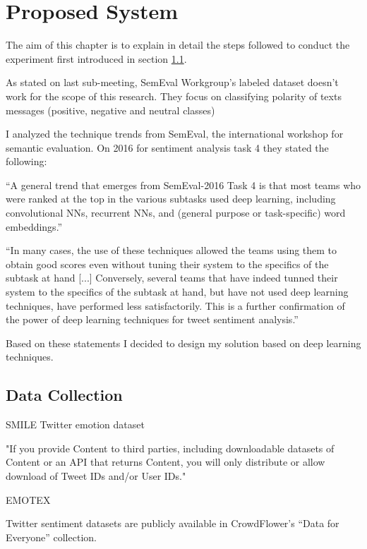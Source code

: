 \chapter{Proposed System}

The aim of this chapter is to explain in detail the steps followed to conduct the experiment first introduced in section \ref{}.

\cite{roberts2012empatweet}

As stated on last sub-meeting, SemEval Workgroup's\cite{SemEvalPortal} labeled dataset doesn't work for the scope of this research. They focus on classifying polarity of texts messages (positive, negative and neutral classes)

I analyzed the technique trends from SemEval, the international workshop for semantic evaluation. On 2016 for sentiment analysis task 4 they stated the following: 

“A general trend that emerges from SemEval-2016 Task 4 is that most teams who were ranked at the top in the various subtasks used deep learning, including convolutional NNs, recurrent NNs, and (general purpose or task-specific) word embeddings.”

“In many cases, the use of these techniques allowed the teams using them to obtain good scores even without tuning their system to the specifics of the subtask at hand [...] Conversely, several teams that have indeed tunned their system to the specifics of the subtask at hand, but have not used deep learning techniques, have performed less satisfactorily. This is a further confirmation of the power of deep learning techniques for tweet sentiment analysis.”

Based on these statements I decided to design my solution based on deep learning techniques.

\section{Data Collection}

SMILE Twitter emotion dataset\cite{wang2016smile}

"If you provide Content to third parties, including downloadable datasets of Content or an API that returns Content, you will only distribute or allow download of Tweet IDs and/or User IDs."\cite{twitterTOS}

EMOTEX\cite{hasan2014emotex} 

Twitter sentiment datasets are publicly available in CrowdFlower's ``Data for Everyone'' collection\cite{CrowdFlowerDfE}.

